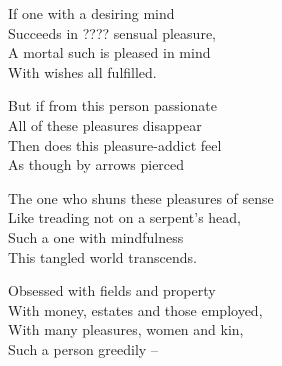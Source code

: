 
\begin{MyDescription}{}
If one with a desiring mind\\
Succeeds in ???? sensual pleasure,\\
A mortal such is pleased in mind\\
With wishes all fulfilled.
\end{MyDescription}


\begin{MyDescription}{}
But if from this person passionate\\
All of these pleasures disappear\\
Then does this pleasure-addict feel\\
As though by arrows pierced
\end{MyDescription}


\begin{MyDescription}{}
The one who shuns these pleasures of sense\\
Like treading not on a serpent's head,\\
Such a one with mindfulness\\
This tangled world transcends.
\end{MyDescription}

\begin{MyDescription}{}
Obsessed with fields and property\\
With money, estates and those employed,\\
With many pleasures, women and kin,\\
Such a person greedily --
\end{MyDescription}

